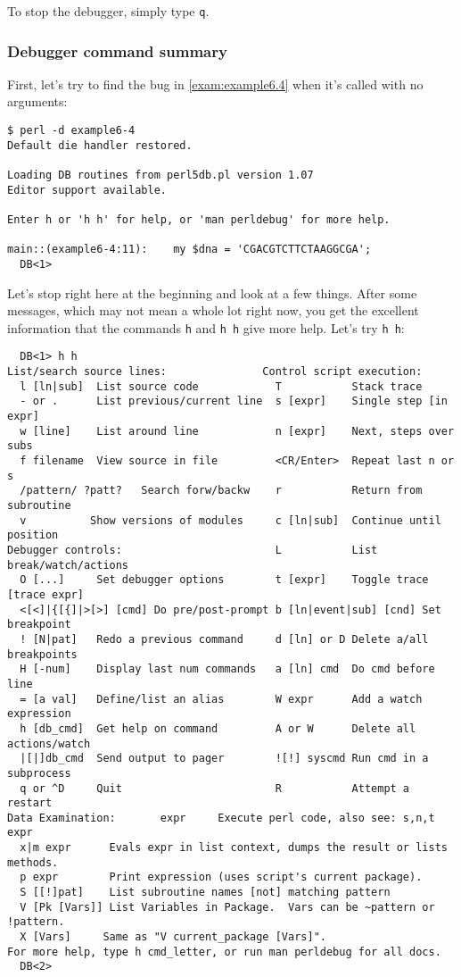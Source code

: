 To stop the debugger, simply type \verb|q|.

\subsubsection{Debugger command summary}
First, let's try to find the bug in \autoref{exam:example6.4} when it's called with no arguments:

\begin{lstlisting}
$ perl -d example6-4
Default die handler restored.

Loading DB routines from perl5db.pl version 1.07
Editor support available.

Enter h or 'h h' for help, or 'man perldebug' for more help.

main::(example6-4:11):    my $dna = 'CGACGTCTTCTAAGGCGA';
  DB<1> 
\end{lstlisting}

Let's stop right here at the beginning and look at a few things. After some messages, which may not mean a whole lot right now, you get the excellent information that the commands \verb|h| and \verb|h h| give more help. Let's try \verb|h h|:

\begin{lstlisting}
  DB<1> h h
List/search source lines:               Control script execution:
  l [ln|sub]  List source code            T           Stack trace
  - or .      List previous/current line  s [expr]    Single step [in expr]
  w [line]    List around line            n [expr]    Next, steps over subs
  f filename  View source in file         <CR/Enter>  Repeat last n or s
  /pattern/ ?patt?   Search forw/backw    r           Return from subroutine
  v          Show versions of modules     c [ln|sub]  Continue until position
Debugger controls:                        L           List break/watch/actions
  O [...]     Set debugger options        t [expr]    Toggle trace [trace expr]
  <[<]|{[{]|>[>] [cmd] Do pre/post-prompt b [ln|event|sub] [cnd] Set breakpoint
  ! [N|pat]   Redo a previous command     d [ln] or D Delete a/all breakpoints
  H [-num]    Display last num commands   a [ln] cmd  Do cmd before line
  = [a val]   Define/list an alias        W expr      Add a watch expression
  h [db_cmd]  Get help on command         A or W      Delete all actions/watch
  |[|]db_cmd  Send output to pager        ![!] syscmd Run cmd in a subprocess
  q or ^D     Quit                        R           Attempt a restart
Data Examination:       expr     Execute perl code, also see: s,n,t expr
  x|m expr      Evals expr in list context, dumps the result or lists methods.
  p expr        Print expression (uses script's current package).
  S [[!]pat]    List subroutine names [not] matching pattern
  V [Pk [Vars]] List Variables in Package.  Vars can be ~pattern or !pattern.
  X [Vars]     Same as "V current_package [Vars]".
For more help, type h cmd_letter, or run man perldebug for all docs.
  DB<2> 
\end{lstlisting}

